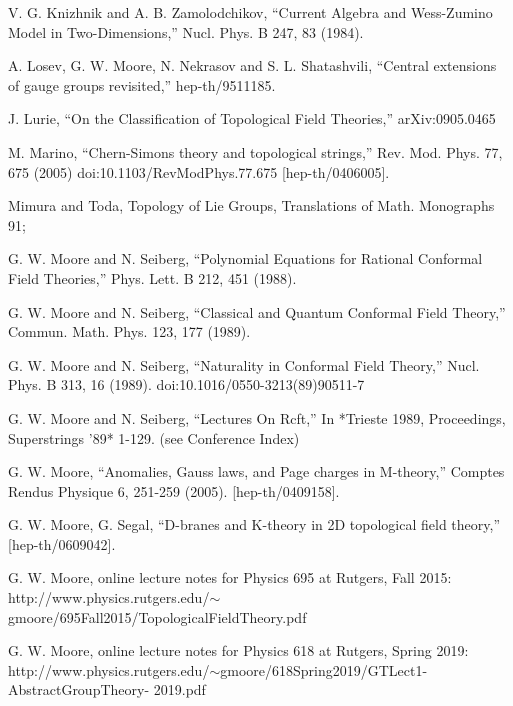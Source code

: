 \begin{enumerate}[label={[\arabic*]},leftmargin=3.2em,itemsep=2pt,topsep=4pt]
\item V. G. Knizhnik and A. B. Zamolodchikov, “Current Algebra and Wess-Zumino Model in Two-Dimensions,” Nucl. Phys. B 247, 83 (1984).

\item A. Losev, G. W. Moore, N. Nekrasov and S. L. Shatashvili, “Central extensions of gauge groups revisited,” hep-th/9511185.

\item J. Lurie, “On the Classification of Topological Field Theories,” arXiv:0905.0465

\item M. Marino, “Chern-Simons theory and topological strings,” Rev. Mod. Phys. 77, 675 (2005) doi:10.1103/RevModPhys.77.675 [hep-th/0406005].

\item Mimura and Toda, Topology of Lie Groups, Translations of Math. Monographs 91;

\item G. W. Moore and N. Seiberg, “Polynomial Equations for Rational Conformal Field Theories,” Phys. Lett. B 212, 451 (1988).

\item G. W. Moore and N. Seiberg, “Classical and Quantum Conformal Field Theory,” Commun. Math. Phys. 123, 177 (1989).

\item G. W. Moore and N. Seiberg, “Naturality in Conformal Field Theory,” Nucl. Phys. B 313, 16 (1989). doi:10.1016/0550-3213(89)90511-7

\item G. W. Moore and N. Seiberg, “Lectures On Rcft,” In *Trieste 1989, Proceedings, Superstrings ’89* 1-129. (see Conference Index)

\item G. W. Moore, “Anomalies, Gauss laws, and Page charges in M-theory,” Comptes Rendus Physique 6, 251-259 (2005). [hep-th/0409158].

\item G. W. Moore, G. Segal, “D-branes and K-theory in 2D topological field theory,” [hep-th/0609042].

\item G. W. Moore, online lecture notes for Physics 695 at Rutgers, Fall 2015: http://www.physics.rutgers.edu/\ensuremath{\sim}gmoore/695Fall2015/TopologicalFieldTheory.pdf

\item G. W. Moore, online lecture notes for Physics 618 at Rutgers, Spring 2019: http://www.physics.rutgers.edu/\ensuremath{\sim}gmoore/618Spring2019/GTLect1-AbstractGroupTheory- 2019.pdf


\end{enumerate}
